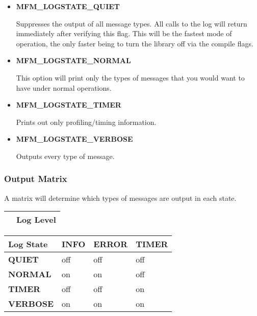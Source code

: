 \begin{itemize}
\item{\bf MFM\_LOGSTATE\_QUIET}

Suppresses the output of all message types.  All calls to the log will
return immediately after verifying this flag.  This will be the fastest mode of
operation, the only faster being to turn the library off via the compile flags.

\item{\bf MFM\_LOGSTATE\_NORMAL}

This option will print only the types of messages that you would want to have
under normal operations.

\item{\bf MFM\_LOGSTATE\_TIMER}

Prints out only profiling/timing information.

\item{\bf MFM\_LOGSTATE\_VERBOSE}

Outputs every type of message.

\end{itemize}

\subsubsection{Output Matrix}

A matrix will determine which types of messages are output in each state.
\begin{tabular}{|p{1.5in}|p{3.33in}|} \hline
  & {\bf Log Level} \\ \hline
\end{tabular}
\begin{tabular}{|p{1.5in}|p{1.0in}|p{1.0in}|p{1.0in}|} \hline
{\bf Log State}   & {\bf INFO }& {\bf ERROR } & {\bf TIMER} \\ \hline
{\bf QUIET}       & off & off & off \\ \hline
{\bf NORMAL}      & on & on & off \\ \hline
{\bf TIMER}       & off & off & on \\ \hline
{\bf VERBOSE}     & on & on  & on  \\ \hline
\end{tabular}


